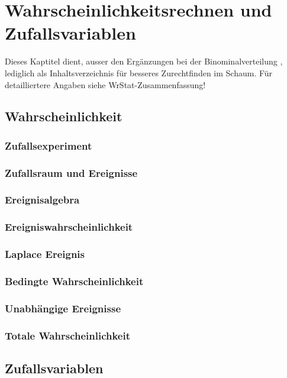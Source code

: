 \section{Wahrscheinlichkeitsrechnen und Zufallsvariablen }
Dieses Kaptitel dient, ausser den Ergänzungen bei der Binominalverteilung
 \normalsize, lediglich als Inhaltsverzeichnis für besseres
Zurechtfinden im Schaum.
Für detailliertere Angaben siehe WrStat-Zusammenfassung!

\subsection{Wahrscheinlichkeit }
\subsubsection{Zufallsexperiment }
\subsubsection{Zufallsraum und Ereignisse }
\subsubsection{Ereignisalgebra }
\subsubsection{Ereigniswahrscheinlichkeit }
\subsubsection{Laplace Ereignis }
\subsubsection{Bedingte Wahrscheinlichkeit }
\subsubsection{Unabhängige Ereignisse }
\subsubsection{Totale Wahrscheinlichkeit }
\vspace{0.25cm}

\subsection{Zufallsvariablen }
